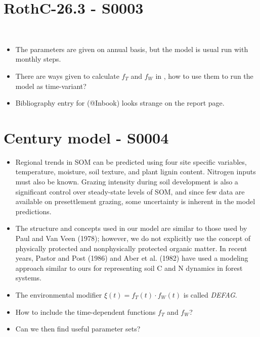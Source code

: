 \documentclass[american, 12pt]{article}
\newcommand{\red}[1]{{\color{red}#1}}
\begin{document}
\section{RothC-26.3 - S0003}
\citep{Jenkinson1977SoilScience}\\
\begin{itemize}
  \item The parameters are given on annual basis, but the model is usual run with monthly steps.
  \item \red{There are ways given to calculate $f_T$ and $f_W$ in \cite{Coleman1996}, how to use them to run the model as time-variant?}
  \item \red{Bibliography entry for \cite{Coleman1996} (@Inbook) looks strange on the report page.}
\end{itemize}

\section{Century model - S0004}
\citep{Parton1987SoilSciSocAmJ}
\begin{itemize}
  \item Regional trends in SOM can be predicted using four site specific variables, temperature, moisture, soil texture, and plant lignin content. Nitrogen inputs must also be known. Grazing intensity during soil development is also a significant control over steady-state levels of SOM, and since few data are available on presettlement grazing, some uncertainty is inherent in the model predictions.
  \item The structure and concepts used in our model are similar to those used by Paul and Van Veen (1978); however, we do not explicitly use the concept of physically protected and nonphysically protected organic matter. In recent years, Pastor and Post (1986) and Aber et al. (1982) have used a modeling approach similar to ours for representing soil C and N dynamics in forest systems.
  \item The environmental modifier $\xi(t) = f_T(t) \cdot f_W(t)$ is called \emph{DEFAG}.
  \item \red{How to include the time-dependent functions $f_T$ and $f_W$?}
  \item \red{Can we then find useful parameter sets?}
\end{itemize}
\end{document}
